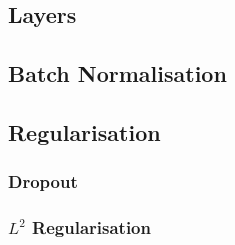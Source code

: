         \subsection{Layers}
            
            \subsection{Batch Normalisation}
            
        \subsection{Regularisation}
        
            \subsubsection{Dropout}
            
            \subsubsection{$L^2$ Regularisation}
            
        
